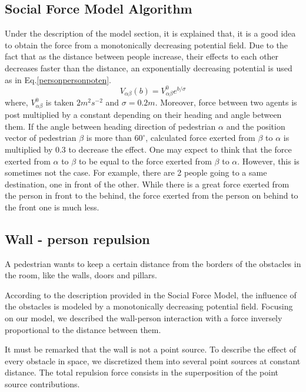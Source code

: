 \documentclass[11pt]{article}
\begin{document}
\subsection{Social Force Model Algorithm}
Under the description of the model section, it is explained that, it is a good idea to obtain the force from a monotonically decreasing potential field. Due to the fact that as the distance between people increase, their effects to each other decreases faster than the distance, an exponentially decreasing potential is used as in Eq.\ref{personpersonpoten}.
\begin{equation}
    V_{\alpha\beta}(b)=V^0_{\alpha\beta}e^{b/\sigma}
    \label{personpersonpoten}
\end{equation}
where, $V^0_{\alpha\beta}$ is taken $2m^2s^{-2}$ and $\sigma=0.2m$. Moreover, force between two agents is post multiplied by a constant depending on their heading and angle between them. If the angle between heading direction of pedestrian $\alpha$ and the position vector of pedestrian $\beta$ is more than $60^\circ$, calculated force exerted from $\beta$ to $\alpha$ is multiplied by 0.3 to decrease the effect. One may expect to think that the force exerted from $\alpha$ to $\beta$ to be equal to the force exerted from $\beta$ to $\alpha$. However, this is sometimes not the case. For example, there are 2 people going to a same destination, one in front of the other. While there is a great force exerted from the person in front to the behind, the force exerted from the person on behind to the front one is much less.

\subsection{Wall - person repulsion}
A pedestrian wants to keep a certain distance from the borders of the obstacles in the room, like the walls, doors and pillars.

According to the description provided in the Social Force Model, the influence of the obstacles is modeled by a monotonically decreasing potential field. Focusing on our model, we described the wall-person interaction with a force inversely proportional to the distance between them.

It must be remarked that the wall is not a point source. To describe the effect of every obstacle in space, we discretized them into several point sources at constant distance. The total repulsion force consists in the superposition of the point source contributions.
\end{document}
